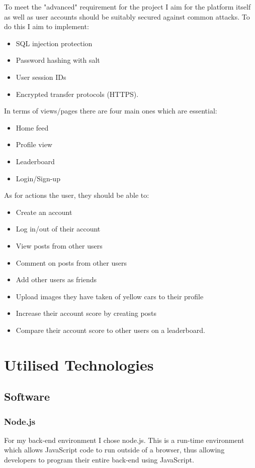 \documentclass[]{final_report}
\begin{document}
To meet the "advanced" requirement for the project I aim for the platform itself as well as user accounts should be suitably secured against common attacks. To do this I aim to implement:

\begin{itemize}
    \item SQL injection protection
    \item Password hashing with salt
    \item User session IDs
    \item Encrypted transfer protocols (HTTPS). 
\end{itemize}

In terms of views/pages there are four main ones which are essential:

\begin{itemize}
    \item Home feed
    \item Profile view
    \item Leaderboard
    \item Login/Sign-up
\end{itemize}

As for actions the user, they should be able to:

\begin{itemize}
    \item Create an account
    \item Log in/out of their account
    \item View posts from other users
    \item Comment on posts from other users
    \item Add other users as friends
    \item Upload images they have taken of yellow cars to their profile
    \item Increase their account score by creating posts
    \item Compare their account score to other users on a leaderboard.
\end{itemize}

\chapter{Utilised Technologies}

\section{Software}

\subsection{Node.js}
For my back-end environment I chose node.js. This is a run-time environment which allows JavaScript code to run outside of a browser, thus allowing developers to program their entire back-end using JavaScript. 
\end{document}
